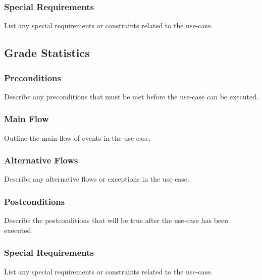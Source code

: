 \documentclass{article}
\begin{document}
\subsubsection{Special Requirements}
List any special requirements or constraints related to the use-case.

\subsection{Grade Statistics}
\subsubsection{Preconditions}
Describe any preconditions that must be met before the use-case can be executed.
\subsubsection{Main Flow}
Outline the main flow of events in the use-case.

\subsubsection{Alternative Flows}
Describe any alternative flows or exceptions in the use-case.

\subsubsection{Postconditions}
Describe the postconditions that will be true after the use-case has been executed.

\subsubsection{Special Requirements}
List any special requirements or constraints related to the use-case.
\end{document}
